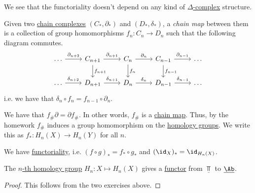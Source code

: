 \begin{remark}
	We see that the functoriality doesn't depend on any kind of \hyperref[def:delta-complex]{\(\Delta \)-complex} structure.
\end{remark}

\begin{definition}\label{def:chain-map}
	Given two \hyperref[def:chain-complex]{chain complexes} \((C_\ast, \partial_\ast)\) and \((D_\ast, \delta_\ast)\), a \emph{chain map} between them is a collection of group homomorphisms \(f_n \colon C_n \to D_n\) such that the following diagram commutes.
	\[
		\begin{tikzcd}
			\dots & {C_{n+1}} & {C_n} & {C_{n-1}} & \dots \\
			\dots & {D_{n+1}} & {D_n} & {D_{n-1}} & \dots
			\arrow["{\partial_{n+2}}", from=1-1, to=1-2]
			\arrow["{\delta_{n+2}}", from=2-1, to=2-2]
			\arrow["{\delta_{n+1}}", from=2-2, to=2-3]
			\arrow["{\delta_{n}}", from=2-3, to=2-4]
			\arrow["{\partial_{n-1}}", from=1-4, to=1-5]
			\arrow["{\partial_{n}}", from=1-3, to=1-4]
			\arrow["{\partial_{n+1}}", from=1-2, to=1-3]
			\arrow["{\delta_{n-1}}", from=2-4, to=2-5]
			\arrow["{f_{n-1}}", from=1-4, to=2-4]
			\arrow["{f_{n}}", from=1-3, to=2-3]
			\arrow["{f_{n+1}}", from=1-2, to=2-2]
		\end{tikzcd}
	\]
	i.e. we have that \(\delta_n \circ f_n = f_{n - 1} \circ \partial_n\).
\end{definition}

\begin{exercise}
	We have that \(f_{\#} \partial = \partial f_{\#}\). In other words, \(f_{\#}\) is a \hyperref[def:chain-map]{chain map}. Thus, by the homework \(f_{\#}\) induces a group homomorphism on the \hyperref[def:homology-group]{homology groups}. We write this as \(f_\ast \colon H_n(X) \to H_n(Y)\) for all \(n\).
\end{exercise}

\begin{exercise}
	We have \underline{functoriality}, i.e. \((f \circ g)_\ast = f_\ast \circ g_\ast\) and \((\id_X)_\ast = \id_{H_n(X)}\).
\end{exercise}

\begin{theorem}\label{thm:homology-group-defines-a-functor}
	The \hyperref[def:homology-group]{\(n\)-th homology group} \(H_n \colon X \mapsto H_n(X)\) gives a \hyperref[def:functor]{functor} from \(\underline{\Top}\) to \(\underline{\Ab }\).
\end{theorem}
\begin{proof}
	This follows from the two exercises above.
\end{proof}


